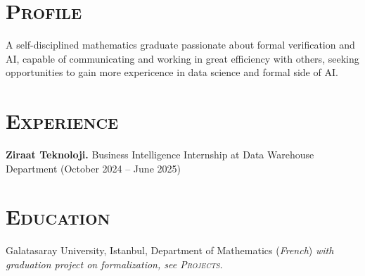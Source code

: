 \documentclass[oneside, 10pt]{memoir}
\begin{document}
\pagestyle{empty}
\section*{\textsc{Profile}}
\noindent
A self-disciplined mathematics graduate passionate about formal
verification and AI, capable of communicating and working in great
efficiency with others, seeking opportunities to gain more expericence in
data science and formal side of AI.
\section*{\textsc{Experience}}
\noindent
\textbf{Ziraat Teknoloji.}
Business Intelligence Internship at Data Warehouse Department
(October 2024 -- June 2025)
\section*{\textsc{Education}}
\noindent
Galatasaray University, Istanbul, Department of Mathematics
(\textit{French})
\textit{with graduation project on formalization, see \textsc{Projects}.}
%
\end{document}
